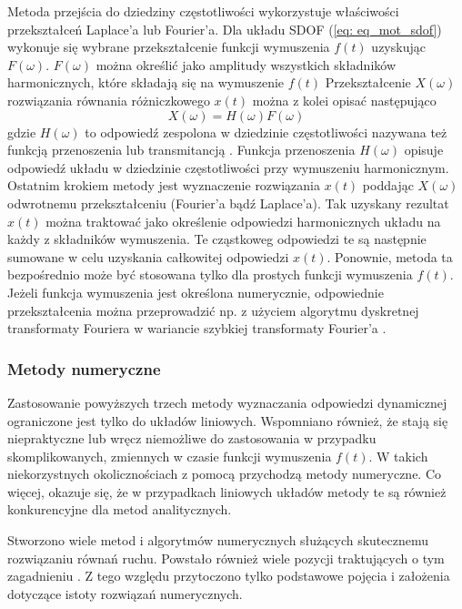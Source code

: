 Metoda przejścia do dziedziny częstotliwości  wykorzystuje właściwości przekształceń Laplace'a lub Fourier'a. Dla układu SDOF (\ref{eq: eq_mot_sdof}) wykonuje się wybrane przekształcenie funkcji wymuszenia $f(t)$ uzyskując $F(\omega)$. $F(\omega)$ można określić jako amplitudy wszystkich składników harmonicznych, które składają się na wymuszenie $f(t)$ Przekształcenie $X(\omega)$ rozwiązania równania różniczkowego $x(t)$ można z kolei opisać następująco
\begin{equation}
	X(\omega)=H(\omega)F(\omega)
\end{equation}
gdzie $H(\omega)$ to odpowiedź zespolona w dziedzinie częstotliwości nazywana też funkcją przenoszenia lub transmitancją . Funkcja przenoszenia $H(\omega)$ opisuje odpowiedź układu w dziedzinie częstotliwości przy wymuszeniu harmonicznym. Ostatnim krokiem metody jest wyznaczenie rozwiązania $x(t)$ poddając $X(\omega)$ odwrotnemu przekształceniu (Fourier'a bądź Laplace'a). Tak uzyskany rezultat $x(t)$ można traktować jako określenie odpowiedzi harmonicznych układu na każdy z składników wymuszenia. Te cząstkoweg odpowiedzi te są następnie sumowane w celu uzyskania całkowitej odpowiedzi $x(t)$. Ponownie, metoda ta bezpośrednio może być stosowana tylko dla prostych funkcji wymuszenia $f(t)$. Jeżeli funkcja wymuszenia jest określona numerycznie, odpowiednie przekształcenia można przeprowadzić np. z użyciem algorytmu dyskretnej transformaty Fouriera w wariancie szybkiej transformaty Fourier'a .

\subsubsection{Metody numeryczne}

Zastosowanie powyższych trzech metody wyznaczania odpowiedzi dynamicznej ograniczone jest tylko do układów liniowych. Wspomniano również, że stają się niepraktyczne lub wręcz niemożliwe do zastosowania w przypadku skomplikowanych, zmiennych w czasie funkcji wymuszenia $f(t)$. W takich niekorzystnych okolicznościach z pomocą przychodzą metody numeryczne. Co więcej, okazuje się, że w przypadkach liniowych układów metody te są również konkurencyjne dla metod analitycznych. 

Stworzono wiele metod i algorytmów numerycznych służących skutecznemu rozwiązaniu równań ruchu. Powstało również wiele pozycji traktujących o tym zagadnieniu \parencite{Humar1974,Hughes1987,Bathe2006,Bajer2012,Rakowski2016}. Z tego względu przytoczono tylko podstawowe pojęcia i założenia dotyczące istoty rozwiązań numerycznych.

